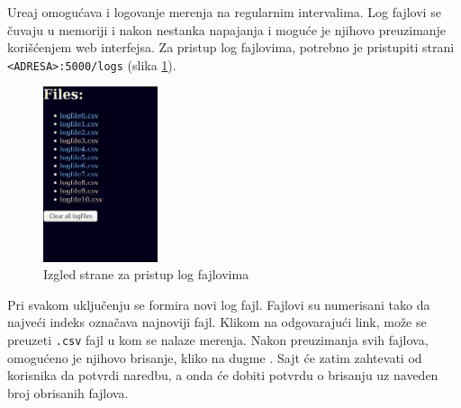 \documentclass[a4paper]{article}
\begin{document}
	Ure\dj aj omogu\' cava i logovanje merenja na regularnim intervalima. Log fajlovi se \v cuvaju u memoriji
	i nakon nestanka napajanja i mogu\' ce je njihovo preuzimanje kori\v s\' cenjem web interfejsa. 
	Za pristup log fajlovima, potrebno je pristupiti strani \texttt{<ADRESA>:5000/logs} (slika \ref{fig:logs}).
	\begin{figure}[H]
		\centering
		\includegraphics[width=0.3\textwidth]{graphics/logs.png}
		\caption{Izgled strane za pristup log fajlovima}
		\label{fig:logs}		
	\end{figure}	
	
	Pri svakom 
	uklju\v cenju se formira novi log fajl. Fajlovi su numerisani tako da najve\' ci indeks ozna\v cava 
	najnoviji fajl. Klikom na odgovaraju\' ci link, mo\v ze se preuzeti \texttt{.csv} fajl u kom se nalaze
	merenja. Nakon preuzimanja svih fajlova, omogu\' ceno je njihovo brisanje, kliko na dugme . Sajt \' ce zatim zahtevati od korisnika da potvrdi naredbu, a onda \' ce dobiti potvrdu
	o brisanju uz naveden broj obrisanih fajlova.
\end{document}
